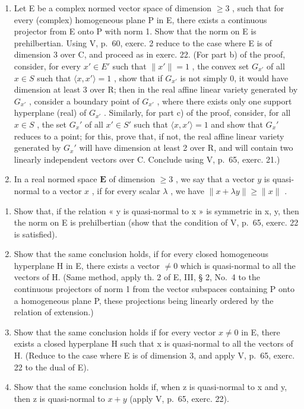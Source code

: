 \begin{enumerate}
\def\labelenumi{¶ \arabic{enumi})}
\setcounter{enumi}{22}
\item
  Let E be a complex normed vector space of dimension \(\geqslant 3\) , such that for every (complex) homogeneous plane P in E, there exists a continuous projector from E onto P with norm 1. Show that the norm on E is prehilbertian. Using V, p.~60, exerc. 2 reduce to the case where E is of dimension 3 over C, and proceed as in exerc. 22. (For part b) of the proof, consider, for every \(x' \in E'\) such that \(\|x'\| = 1\) , the convex set \(G_{x'}\) of all \(x \in S\) such that \(\langle x, x' \rangle = 1\) , show that if \(G_{x'}\) is not simply 0, it would have dimension at least 3 over R; then in the real affine linear variety generated by \(G_{x'}\) , consider a boundary point of \(G_{x'}\) , where there exists only one support hyperplane (real) of \(G_{x'}\) . Similarly, for part c) of the proof, consider, for all \(x \in S\) , the set \(G_{x}'\) of all \(x' \in S'\) such that \(\langle x, x' \rangle = 1\) and show that \(G_{x}'\) reduces to a point; for this, prove that, if not, the real affine linear variety generated by \(G_{x}'\) will have dimension at least 2 over R, and will contain two linearly independent vectors over C. Conclude using V, p.~65, exerc. 21.)
\item
  In a real normed space \(\mathbf{E}\) of dimension \(\geqslant 3\) , we say that a vector \(y\) is quasi-normal to a vector \(x\) , if for every scalar \(\lambda\) , we have \(\| x + \lambda y \| \geqslant \| x \|\) .
\end{enumerate}

\begin{enumerate}
\def\labelenumi{\alph{enumi})}
\item
  Show that, if the relation « y is quasi-normal to x » is symmetric in x, y, then the norm on E is prehilbertian (show that the condition of V, p.~65, exerc. 22 is satisfied).
\item
  Show that the same conclusion holds, if for every closed homogeneous hyperplane H in E, there exists a vector \(\neq 0\) which is quasi-normal to all the vectors of H. (Same method, apply th. 2 of E, III, § 2, No.~4 to the continuous projectors of norm 1 from the vector subspaces containing P onto a homogeneous plane P, these projections being linearly ordered by the relation of extension.)
\item
  Show that the same conclusion holds if for every vector \(x \neq 0\) in E, there exists a closed hyperplane H such that x is quasi-normal to all the vectors of H. (Reduce to the case where E is of dimension 3, and apply V, p.~65, exerc. 22 to the dual of E).
\item
  Show that the same conclusion holds if, when z is quasi-normal to x and y, then z is quasi-normal to \(x + y\) (apply V, p.~65, exerc. 22).
\end{enumerate}

